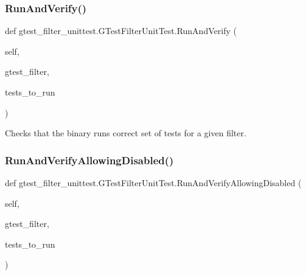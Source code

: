 \subsubsection{\texorpdfstring{Run\+And\+Verify()}{RunAndVerify()}}
{\footnotesize\ttfamily def gtest\+\_\+filter\+\_\+unittest.\+G\+Test\+Filter\+Unit\+Test.\+Run\+And\+Verify (\begin{DoxyParamCaption}\item[{}]{self,  }\item[{}]{gtest\+\_\+filter,  }\item[{}]{tests\+\_\+to\+\_\+run }\end{DoxyParamCaption})}

\begin{DoxyVerb}Checks that the binary runs correct set of tests for a given filter.\end{DoxyVerb}
 \mbox{\label{classgtest__filter__unittest_1_1_g_test_filter_unit_test_ae52bd70ef1dcb68c83c0379ddfb987a9}} 
\subsubsection{\texorpdfstring{Run\+And\+Verify\+Allowing\+Disabled()}{RunAndVerifyAllowingDisabled()}}
{\footnotesize\ttfamily def gtest\+\_\+filter\+\_\+unittest.\+G\+Test\+Filter\+Unit\+Test.\+Run\+And\+Verify\+Allowing\+Disabled (\begin{DoxyParamCaption}\item[{}]{self,  }\item[{}]{gtest\+\_\+filter,  }\item[{}]{tests\+\_\+to\+\_\+run }\end{DoxyParamCaption})}

